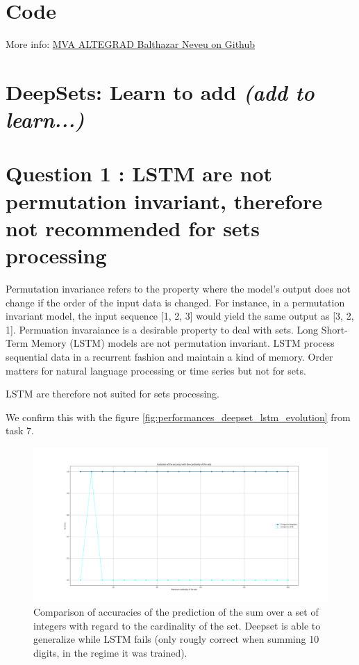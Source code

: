 \documentclass[a4paper]{article}
\begin{document}

\section*{Code}

More info:
\href{https://github.com/balthazarneveu/MVA23_ALTEGRAD/#readme}{MVA ALTEGRAD Balthazar Neveu on Github}

\section*{DeepSets: Learn to add \textit{(add to learn...)}}
\section*{Question 1 : LSTM are not permutation invariant, therefore not recommended for sets processing}
Permutation invariance refers to the property where the model's output does not change if the order of the input data is changed. For instance, in a permutation invariant model, the input sequence [1, 2, 3] would yield the same output as [3, 2, 1]. Permuation invaraiance is a desirable property to deal with sets.
\newline
Long Short-Term Memory (LSTM) models are not permutation invariant. LSTM process sequential data in a recurrent fashion and maintain a kind of memory. Order matters for natural language processing or time series but not for sets. 

LSTM are therefore not suited for sets processing.
\newline



We confirm this with the figure \ref{fig:performances_deepset_lstm_evolution} from task 7.

\begin{figure}[h]
    \centering
    \includegraphics[width=1.\textwidth]{figures/deep_set_performances.png}
    \caption{Comparison of accuracies of the prediction of the sum over a set of integers with regard to the cardinality of the set. Deepset is able to generalize while LSTM fails (only rougly correct when summing 10 digits, in the regime it was trained).}
    \label{fig:performances_deepset_lstm}
\end{figure}
\end{document}
